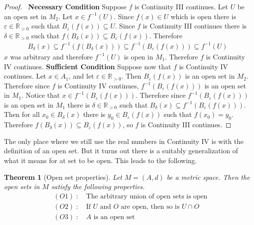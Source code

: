 \documentclass{article}
\theoremstyle{plain}
\newtheorem{theorem}{Theorem}
\theoremstyle{definition}
\newcommand{\R}{\mathbb{R}}
\begin{document}
\begin{proof}$\ $\newline
	\textbf{Necessary Condition}\newline
	Suppose $f$ is Continuity III continues. Let $U$ be an open set in $M_2$.
	Let $x\in f^{-1}(U)$. Since $f(x)\in U$ which is open there is
	$\varepsilon\in\R_{>0}$ such that $B_{\varepsilon}(f(x))\subseteq U$. Since
	$f$ is Continuity III continues there is $\delta\in\R_{>0}$ such that
	$f(B_{\delta}(x))\subseteq B_{\varepsilon}(f(x))$. Therefore
	\begin{equation}
	\begin{aligned}
		B_{\delta}(x)\subseteq f^{-1}(f(B_{\delta}(x))) \subseteq 
		f^{-1}(B_{\varepsilon}(f(x)))\subseteq f^{-1}(U)
	\end{aligned}
	\end{equation}
	$x$ was arbitrary and therefore $f^{-1}(U)$ is open in $M_1$. Therefore $f$
	is Continuity IV continues.
	\newline\newline
	\textbf{Sufficient Condition}\newline
	Suppose now that $f$ is Continuity IV continues. Let $x\in A_1$, and let
	$\varepsilon\in\R_{>0}$. Then $B_{\varepsilon}(f(x))$ is an open set in
	$M_2$. Therefore since $f$ is Continuity IV continues,
	$f^{-1}(B_{\varepsilon}(f(x)))$ is an open set in $M_1$. Notice that
	$x\in f^{-1}(B_{\varepsilon}(f(x)))$. Therefore since
	$f^{-1}(B_{\varepsilon}(f(x)))$ is an open set in $M_1$ there is
	$\delta\in\R_{>0}$ such that $B_{\delta}(x)\subseteq
	f^{-1}(B_{\varepsilon}(f(x)))$. Then for all $x_0\in B_{\delta}(x)$ there is
	$y_0\in B_{\varepsilon}(f(x))$ such that $f(x_0)=y_0$. Therefore
	$f(B_{\delta}(x))\subseteq B_{\varepsilon}(f(x))$, so $f$ is Continuity III
	continues.
\end{proof}
The only place where we still use the real numbers in Continuity IV is with the
definition of an open set. But it turns out there is a suitably generalization
of what it means for at set to be open. This leads to the following.
\begin{theorem}[Open set properties]\label{Openball is openset}
	Let $M=(A,d)$ be a metric space. Then the open sets in $M$
	satisfy the following properties. 
	\begin{equation}
	\begin{aligned}
		&(O1)\; :\quad \text{The arbitrary union of open sets is open}\\
		&(O2)\; :\quad \text{If $U$ and $O$ are open, then so is $U\cap O$}\\
		&(O3)\; :\quad \text{$A$ is an open set}\\
	\end{aligned}
	\end{equation}
\end{theorem}
\end{document}
